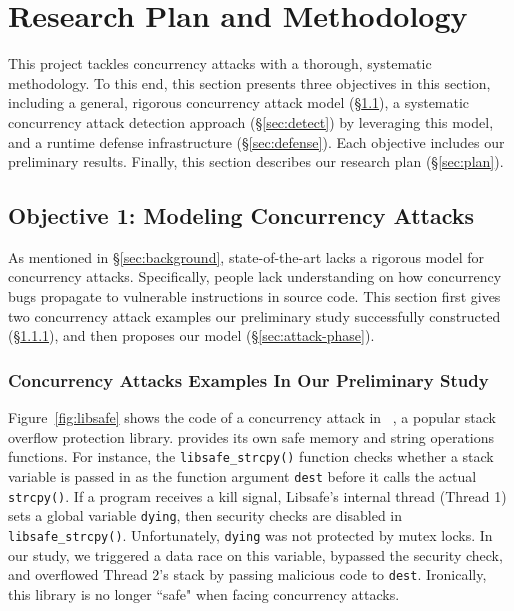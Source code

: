 \section{Research Plan and Methodology} \label{sec:rep}

This \xxx project tackles concurrency attacks with a thorough, systematic 
methodology. To this end, this section presents three objectives in this 
section, including a general, rigorous concurrency attack model 
(\S\ref{sec:model}), a systematic concurrency attack detection approach 
(\S\ref{sec:detect}) by leveraging this model, and a runtime defense 
infrastructure (\S\ref{sec:defense}). Each objective includes our preliminary 
results. Finally, this section describes our research plan (\S\ref{sec:plan}).

\vspace{-.15in}\subsection{Objective 1: Modeling Concurrency Attacks} 
\label{sec:model}\vspace{-.075in}

As mentioned in \S\ref{sec:background}, state-of-the-art lacks a rigorous model 
for concurrency attacks. Specifically, people lack understanding on how 
concurrency bugs propagate to vulnerable instructions in source code. This 
section first gives two concurrency attack examples our preliminary study 
successfully constructed (\S\ref{sec:examples}), and then proposes 
our model (\S\ref{sec:attack-phase}).

\vspace{-.15in}\subsubsection{Concurrency Attacks Examples In Our Preliminary 
Study} 
\label{sec:examples}\vspace{-.075in}

Figure~\ref{fig:libsafe} shows the code of a concurrency attack in 
\libsafe~\cite{libsafe}, a popular stack overflow protection library. \libsafe
provides its own safe memory and string operations functions. For instance, the 
\texttt{libsafe\_strcpy()} function checks whether a stack variable is passed 
in as the function argument \texttt{dest} before it calls the actual 
\texttt{strcpy()}. If a program receives a kill signal, Libsafe's internal 
thread (Thread 1) sets a global variable \texttt{dying}, then security checks 
are disabled in \texttt{libsafe\_strcpy()}. Unfortunately, \texttt{dying} was 
not protected by mutex locks. In our study, we triggered a data race on this 
variable, bypassed the security check, and overflowed Thread 2's stack by 
passing malicious code to \texttt{dest}. Ironically, this \libsafe library is 
no longer ``safe" when facing concurrency attacks.

